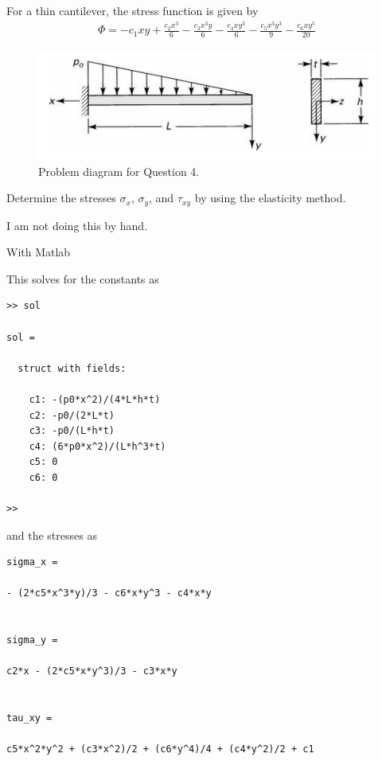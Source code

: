 \section{}
For a thin cantilever, the stress function is given by
\begin{align*}
    \Phi = -c_1xy + \frac{c_2x^3}{6} - \frac{c_3x^3y}{6} - \frac{c_4xy^3}{6} - \frac{c_5x^3y^3}{9} - \frac{c_6xy^5}{20}
\end{align*}
\begin{figure}[h]
    \centering
    \includegraphics[width=0.35\linewidth]{Questions/Figures/Q4ProblemDiagram.png}
    \caption{Problem diagram for Question 4.}
    \label{fig:Q4ProblemDiagram}
\end{figure}
Determine the stresses $\sigma_x$, $\sigma_y$, and $\tau_{xy}$ by using the elasticity method.

I am not doing this by hand. 

With Matlab


This solves for the constants as 
\begin{verbatim}
>> sol

sol = 

  struct with fields:

    c1: -(p0*x^2)/(4*L*h*t)
    c2: -p0/(2*L*t)
    c3: -p0/(L*h*t)
    c4: (6*p0*x^2)/(L*h^3*t)
    c5: 0
    c6: 0

>> 
\end{verbatim}

and the stresses as
\begin{verbatim}
sigma_x =
 
- (2*c5*x^3*y)/3 - c6*x*y^3 - c4*x*y
 
 
sigma_y =
 
c2*x - (2*c5*x*y^3)/3 - c3*x*y
 
 
tau_xy =
 
c5*x^2*y^2 + (c3*x^2)/2 + (c6*y^4)/4 + (c4*y^2)/2 + c1
\end{verbatim}